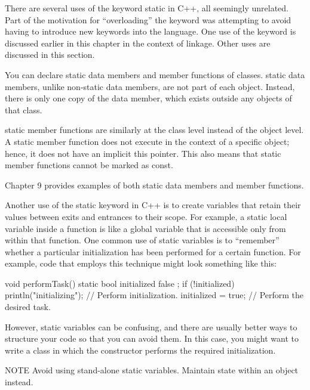 
There are several uses of the keyword static in C++, all seemingly unrelated. Part of the motivation for “overloading” the keyword was attempting to avoid having to introduce new keywords into the language. One use of the keyword is discussed earlier in this chapter in the context of linkage. Other uses are discussed in this section.


You can declare static data members and member functions of classes. static data members, unlike non-static data members, are not part of each object. Instead, there is only one copy of the data member, which exists outside any objects of that class.

static member functions are similarly at the class level instead of the object level. A static member function does not execute in the context of a specific object; hence, it does not have an implicit this pointer. This also means that static member functions cannot be marked as const.

Chapter 9 provides examples of both static data members and member functions.


Another use of the static keyword in C++ is to create variables that retain their values between exits and entrances to their scope. For example, a static local variable inside a function is like a global variable that is accessible only from within that function. One common use of static variables is to “remember” whether a particular initialization has been performed for a certain function. For example, code that employs this technique might look something like this:

\begin{cpp}
void performTask()
{
    static bool initialized { false };
    if (!initialized) {
        println("initializing");
        // Perform initialization.
        initialized = true;
    }
    // Perform the desired task.
}
\end{cpp}

However, static variables can be confusing, and there are usually better ways to structure your code so that you can avoid them. In this case, you might want to write a class in which the constructor performs the required initialization.

\begin{myNotic}{NOTE}
Avoid using stand-alone static variables. Maintain state within an object instead.
\end{myNotic}

